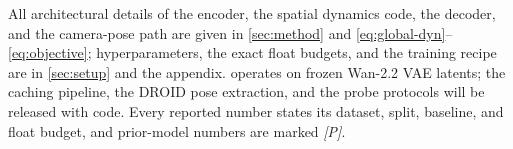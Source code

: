 All architectural details of the encoder, the spatial dynamics code, the decoder,
and the camera-pose path are given in \cref{sec:method} and \cref{eq:global-dyn}--%
\cref{eq:objective}; hyperparameters, the exact float budgets, and the training
recipe are in \cref{sec:setup} and the appendix. \method{} operates on frozen
Wan-2.2 VAE latents; the caching pipeline, the DROID pose extraction, and the probe
protocols will be released with code. Every reported number states its dataset,
split, baseline, and float budget, and prior-model numbers are marked \emph{[P]}.
